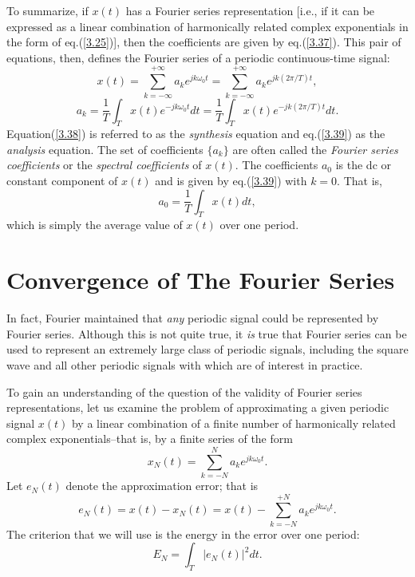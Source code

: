 \documentclass[a4paper,twoside]{book}
\begin{document}
To summarize, if $x(t)$ has a Fourier series representation [i.e., if it can be expressed as a linear combination of harmonically related complex exponentials in the form of eq.\;(\ref{3.25})], then the coefficients are given by eq.\;(\ref{3.37}). This pair of equations, then, defines the Fourier series of a periodic continuous-time signal:
\begin{equation}
    x(t) = \sum_{k=-\infty}^{+\infty}a_{k}e^{jk\omega_{0}t} = \sum_{k=-\infty}^{+\infty}a_{k}e^{jk(2\pi/T)t},
    \label{3.38}
\end{equation}
\begin{equation}
    a_{k}=\frac{1}{T}\int_{T}x(t)e^{-jk\omega_{0}t} dt = \frac{1}{T}\int_{T}x(t)e^{-jk(2\pi/T)t} dt.
    \label{3.39}
\end{equation}
Equation\;(\ref{3.38}) is referred to as the \textit{synthesis} equation and eq.\;(\ref{3.39}) as the \textit{analysis} equation. The set of coefficients $\{a_k\}$ are often called the \textit{Fourier series coefficients} or the \textit{spectral coefficients} of $x(t)$. The coefficients $a_0$ is the dc or constant component of $x(t)$ and is given by eq.\;(\ref{3.39}) with $k=0$. That is,
\begin{equation}
    a_0=\dfrac1T\int_Tx(t)dt,
    \label{3.40}
\end{equation}
which is simply the average value of $x(t)$ over one period.

\section{Convergence of The Fourier Series}
\label{section:3.4}

In fact, Fourier maintained that \textit{any} periodic signal could be represented by Fourier series. Although this is not quite true, it \textit{is} true that Fourier series can be used to represent an extremely large class of periodic signals, including the square wave and all other periodic signals with which are of interest in practice.

To gain an understanding of the question of the validity of Fourier series representations, let us examine the problem of approximating a given periodic signal $x(t)$ by a linear combination of a finite number of harmonically related complex exponentials--that is, by a finite series of the form
\begin{equation}
    x_N(t)=\sum_{k=-N}^Na_ke^{jk\omega_0t}.
    \label{3.47}
\end{equation}
Let $e_N(t)$ denote the approximation error; that is
\begin{equation}
    e_N(t)=x(t)-x_N(t)=x(t)-\sum_{k=-N}^{+N}a_ke^{jk\omega_0t}.
    \label{3.48}
\end{equation}
The criterion that we will use is the energy in the error over one period:
\begin{equation}
    E_N = \int_T|e_N(t)|^2 dt.
    \label{3.49}
\end{equation}
\end{document}
